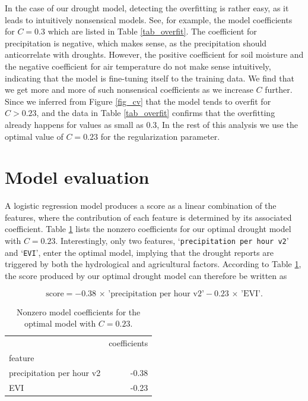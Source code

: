 \documentclass[10pt,parskip=half,
toc=sectionentrywithdots,
bibliography=totocnumbered,
captions=tableheading,numbers=noendperiod]{scrartcl}
\begin{document}
In the case of our drought model, detecting the overfitting is rather
easy, as it leads to intuitively nonsensical models. See, for example,
the model coefficients for \(C=0.3\) which are listed in Table
\ref{tab_overfit}. The coefficient for precipitation is negative, which
makes sense, as the precipitation should anticorrelate with droughts.
However, the positive coefficient for soil moisture and the negative
coefficient for air temperature do not make sense intuitively,
indicating that the model is fine-tuning itself to the training data. We
find that we get more and more of such nonsensical coefficients as we
increase \(C\) further. Since we inferred from Figure \ref{fig_cv} that
the model tends to overfit for \(C>0.23\), and the data in Table
\ref{tab_overfit} confirms that the overfitting already happens for
values as small as 0.3, In the rest of this analysis we use the optimal
value of \(C=0.23\) for the regularization parameter.

\hypertarget{model-evaluation}{%
\section{Model evaluation}\label{model-evaluation}}

A logistic regression model produces a score as a linear combination of
the features, where the contribution of each feature is determined by
its associated coefficient. Table \ref{tab_coefs} lists the nonzero
coefficients for our optimal drought model with \(C=0.23\).
Interestingly, only two features,
`\texttt{precipitation\ per\ hour\ v2}' and `\texttt{EVI}', enter the
optimal model, implying that the drought reports are triggered by both
the hydrological and agricultural factors. According to Table
\ref{tab_coefs}, the score produced by our optimal drought model can
therefore be written as

\begin{equation}\label{eqn_score}
\textrm{score}=-0.38\,\times\,\textrm{'precipitation per hour v2'}-0.23\,\times\,\textrm{'EVI'}.
\end{equation}

\begin{table}[H]
\caption{Nonzero model coefficients for the optimal model with \(C=0.23\).}\label{tab_coefs}
\centering
\begin{adjustbox}{max width=\textwidth}
\begin{tabular}{lr}
\toprule
{} &  coefficients \\
feature                   &               \\
\midrule
precipitation per hour v2 &         -0.38 \\
EVI                       &         -0.23 \\
\bottomrule
\end{tabular}

\end{adjustbox}
\end{table}
\end{document}
